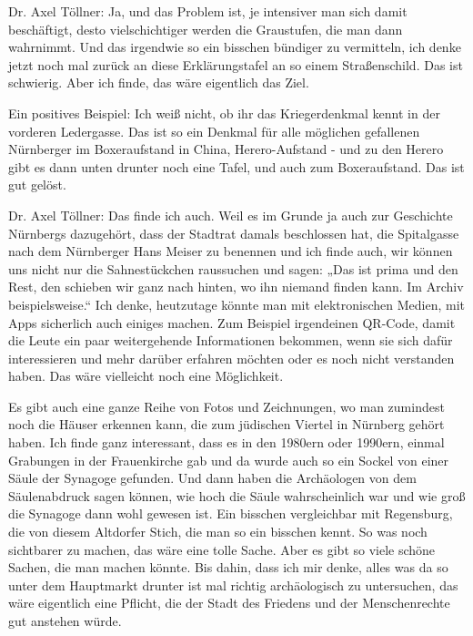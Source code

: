  
Dr. Axel Töllner: Ja, und das Problem ist, je intensiver man sich damit beschäftigt, desto vielschichtiger werden die Graustufen, die man dann wahrnimmt. Und das irgendwie so ein bisschen bündiger zu vermitteln, ich denke jetzt noch mal zurück an diese Erklärungstafel an so einem Straßenschild. Das ist schwierig. Aber ich finde, das wäre eigentlich das Ziel. 

 
Ein positives Beispiel: Ich weiß nicht, ob ihr das Kriegerdenkmal kennt in der vorderen Ledergasse. Das ist so ein Denkmal für alle möglichen gefallenen Nürnberger im Boxeraufstand in China, Herero-Aufstand - und zu den Herero gibt es dann unten drunter noch eine Tafel, und auch zum Boxeraufstand. Das ist gut gelöst. 

 
Dr. Axel Töllner: Das finde ich auch. Weil es im Grunde ja auch zur Geschichte Nürnbergs dazugehört, dass der Stadtrat damals beschlossen hat, die Spitalgasse nach dem Nürnberger Hans Meiser zu benennen und ich finde auch, wir können uns nicht nur die Sahnestückchen raussuchen und sagen: „Das ist prima und den Rest, den schieben wir ganz nach hinten, wo ihn niemand finden kann. Im Archiv beispielsweise.“ Ich denke, heutzutage könnte man mit elektronischen Medien, mit Apps sicherlich auch einiges machen. Zum Beispiel irgendeinen QR-Code, damit die Leute ein paar weitergehende Informationen bekommen, wenn sie sich dafür interessieren und mehr darüber erfahren möchten oder es noch nicht verstanden haben. Das wäre vielleicht noch eine Möglichkeit.  

Es gibt auch eine ganze Reihe von Fotos und Zeichnungen, wo man zumindest noch die Häuser erkennen kann, die zum jüdischen Viertel in Nürnberg gehört haben. Ich finde ganz interessant, dass es in den 1980ern oder 1990ern, einmal Grabungen in der Frauenkirche gab und da wurde auch so ein Sockel von einer Säule der Synagoge gefunden. Und dann haben die Archäologen von dem Säulenabdruck sagen können, wie hoch die Säule wahrscheinlich war und wie groß die Synagoge dann wohl gewesen ist. Ein bisschen vergleichbar mit Regensburg, die von diesem Altdorfer Stich, die man so ein bisschen kennt. So was noch sichtbarer zu machen, das wäre eine tolle Sache. Aber es gibt so viele schöne Sachen, die man machen könnte. Bis dahin, dass ich mir denke, alles was da so unter dem Hauptmarkt drunter ist mal richtig archäologisch zu untersuchen, das wäre eigentlich eine Pflicht, die der Stadt des Friedens und der Menschenrechte gut anstehen würde. 

 